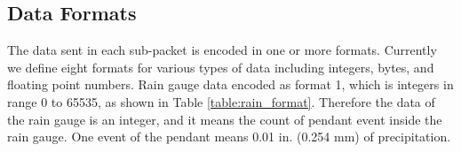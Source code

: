 \subsection{Data Formats}

The data sent in each sub-packet is encoded in one or more formats. Currently we define eight formats for various types of data including integers, bytes,
and floating point numbers. Rain gauge data encoded as format 1, which is integers in range 0 to 65535, as shown in Table \ref{table:rain_format}.
Therefore the data of the rain gauge is an integer, and it means the count of pendant event inside the rain gauge. One event of the pendant means 0.01 in. (0.254 mm) of precipitation.
\\


\begin{table}[H]
    \caption{Data format for rain gauge}
    \label{table:rain_format}
\end{table}

\clearpage